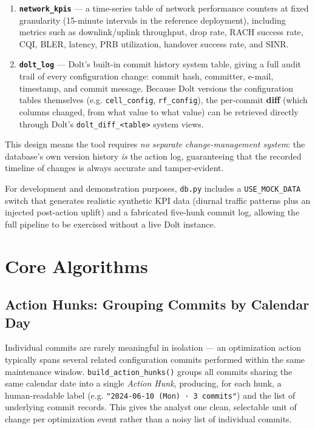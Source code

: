 \begin{enumerate}
    \item \textbf{\texttt{network\_kpis}} --- a time-series table of
        network performance counters at fixed granularity (15-minute
        intervals in the reference deployment), including metrics such
        as downlink/uplink throughput, drop rate, RACH success rate,
        CQI, BLER, latency, PRB utilization, handover success rate, and
        SINR.
    \item \textbf{\texttt{dolt\_log}} --- Dolt's built-in commit history
        system table, giving a full audit trail of every configuration
        change: commit hash, committer, e-mail, timestamp, and commit
        message. Because Dolt versions the configuration tables
        themselves (e.g. \texttt{cell\_config}, \texttt{rf\_config}),
        the per-commit \textbf{diff} (which columns changed, from what
        value to what value) can be retrieved directly through Dolt's
        \texttt{dolt\_diff\_<table>} system views.
\end{enumerate}

This design means the tool requires \emph{no separate change-management
system}: the database's own version history \emph{is} the action log,
guaranteeing that the recorded timeline of changes is always accurate and
tamper-evident.

For development and demonstration purposes, \texttt{db.py} includes a
\texttt{USE\_MOCK\_DATA} switch that generates realistic synthetic KPI
data (diurnal traffic patterns plus an injected post-action uplift) and a
fabricated five-hunk commit log, allowing the full pipeline to be
exercised without a live Dolt instance.

\section{Core Algorithms}

\subsection{Action Hunks: Grouping Commits by Calendar Day}
Individual commits are rarely meaningful in isolation --- an optimization
action typically spans several related configuration commits performed
within the same maintenance window. \texttt{build\_action\_hunks()} groups
all commits sharing the same calendar date into a single \emph{Action
Hunk}, producing, for each hunk, a human-readable label (e.g.
\texttt{"2024-06-10 (Mon) · 3 commits"}) and the list of underlying
commit records. This gives the analyst one clean, selectable unit of
change per optimization event rather than a noisy list of individual
commits.

